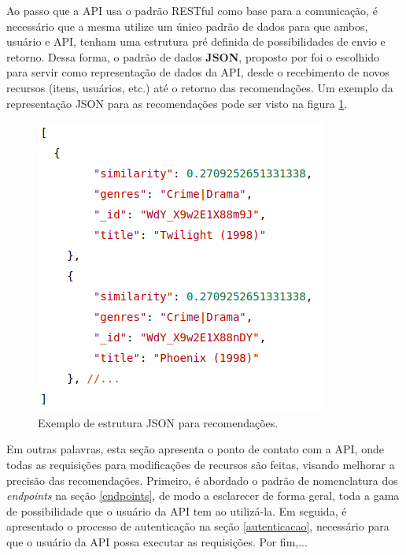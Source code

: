 \documentclass[12pt, openright, oneside, a4paper, brazil]{abntex2}
\begin{document}
Ao passo que a API usa o padrão RESTful como base para a comunicação, é necessário que a mesma utilize um único padrão de dados para que ambos, usuário e API, tenham uma estrutura pré definida de possibilidades de envio e retorno. Dessa forma, o padrão de dados \textbf{JSON}, proposto por  foi o escolhido para servir como representação de dados da API, desde o recebimento de novos recursos (itens, usuários, etc.) até o retorno das recomendações. Um exemplo da representação JSON para as recomendações pode ser visto na figura \ref{json_example}.

\begin{figure}[h!tp]

	\caption{\label{json_example}Exemplo de estrutura JSON para recomendações.}

	\begin{center}
		\includegraphics[scale=0.75]{images/json_example.png}
	\end{center}

	\hspace{5.5cm}{Fonte: O Autor.}

\end{figure}

Em outras palavras, esta seção apresenta o ponto de contato com a API, onde todas as requisições para modificações de recursos são feitas, visando melhorar a precisão das recomendações. Primeiro, é abordado o padrão de nomenclatura dos \textit{endpoints} na seção \ref{endpoints}, de modo a esclarecer de forma geral, toda a gama de possibilidade que o usuário da API tem ao utilizá-la. Em seguida, é apresentado o processo de autenticação na seção \ref{autenticacao}, necessário para que o usuário da API possa executar as requisições. Por fim,... 
\end{document}
